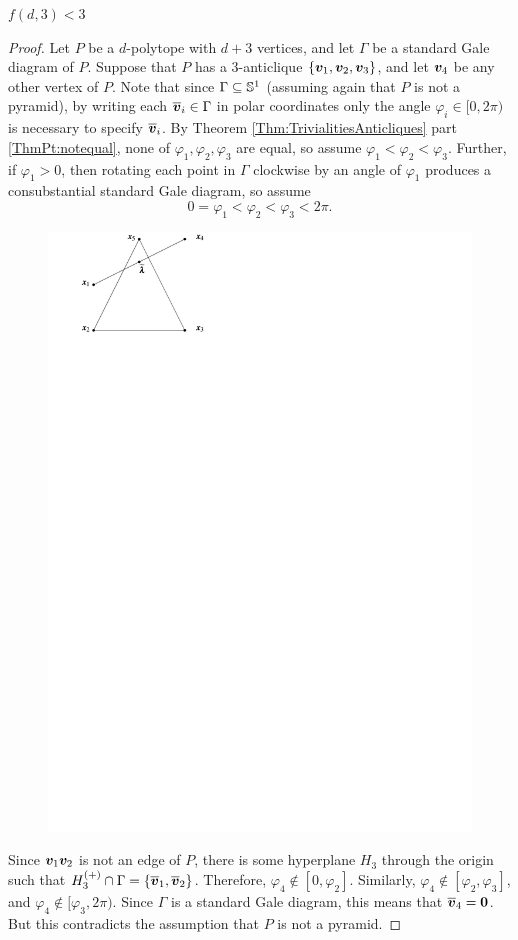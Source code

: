 \begin{Theorem}
    \(f(d,3)<3\)
\end{Theorem}
\begin{proof}
    Let \(P\) be a \(d\)-polytope with \(d+3\) vertices, and let \(\Gamma\) be  a standard Gale diagram of \(P\).  Suppose that \(P\) has a \(3\)-anticlique \(\left\{\bm{v}_1,\bm{v}_2,\bm{v}_3\right\}\), and let \(\bm{v}_4\) be any other vertex of \(P\).  Note that since \(\Gamma\subseteq\mathbb{S}^{1}\) (assuming again that \(P\) is not  a pyramid), by writing each \(\overline{\bm{v}}_i\in\Gamma\) in polar coordinates only the angle \(\varphi_i\in[0,2\pi)\) is necessary to specify \(\overline{\bm{v}}_i\).  By Theorem \ref{Thm:TrivialitiesAnticliques} part \ref{ThmPt:notequal}, none of \(\varphi_1,\varphi_2,\varphi_3\) are equal, so assume \(\varphi_1<\varphi_2<\varphi_3\).  Further, if \(\varphi_1>0\), then rotating each point in \(\Gamma\) clockwise by an angle of \(\varphi_1\) produces a consubstantial standard Gale diagram, so assume
        \[
            0=\varphi_1<\varphi_2<\varphi_3<2\pi.
        \]

        \begin{center}
            \begin{figure}[h!bt]
                \includegraphics[page=23, width=.3\textwidth]{pictures.pdf}
            \end{figure}
        \end{center}

    Since \(\bm{v}_1\bm{v}_2\) is not an edge of \(P\), there is some hyperplane \(H_3\) through the origin such that \(H_3^{(+)}\cap\Gamma=\left\{\overline{\bm{v}}_1,\overline{\bm{v}}_2\right\}\).  Therefore, \(\varphi_4\notin[0,\varphi_2]\).  Similarly, \(\varphi_4\notin[\varphi_2,\varphi_3]\), and \(\varphi_4\notin[\varphi_3,2\pi)\).  Since \(\Gamma\) is a standard Gale diagram, this means that \(\overline{\bm{v}}_4=\bm{0}\).  But this contradicts the assumption that \(P\) is not a pyramid.
\end{proof}



